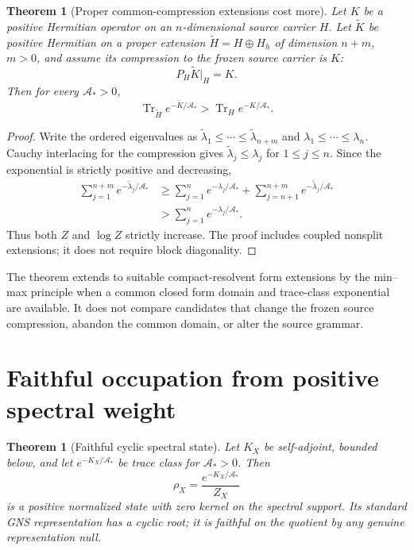\documentclass[11pt,a4paper]{article}
\newtheorem{theorem}[definition]{Theorem}
\theoremstyle{remark}
\newcommand{\Tr}{\operatorname{Tr}}
\begin{document}
\begin{theorem}[Proper common-compression extensions cost more]
\label{thm:strict_extension}
Let $K$ be a positive Hermitian operator on an $n$-dimensional source carrier
$H$.  Let $\widetilde K$ be positive Hermitian on a proper extension
$\widetilde H=H\oplus H_h$ of dimension $n+m$, $m>0$, and assume its
compression to the frozen source carrier is $K$:
\begin{equation}
 P_H\widetilde K\vert_H=K.
 \label{eq:compression}
\end{equation}
Then for every $\mathcal A_*>0$,
\begin{equation}
 \Tr_{\widetilde H}e^{-\widetilde K/\mathcal A_*}
 >\Tr_He^{-K/\mathcal A_*}.
 \label{eq:stricttrace}
\end{equation}
\end{theorem}

\begin{proof}
Write the ordered eigenvalues as
$\widetilde\lambda_1\le\cdots\le\widetilde\lambda_{n+m}$ and
$\lambda_1\le\cdots\le\lambda_n$.  Cauchy interlacing for the compression
gives $\widetilde\lambda_j\le\lambda_j$ for $1\le j\le n$.  Since the
exponential is strictly positive and decreasing,
\begin{align}
 \sum_{j=1}^{n+m}e^{-\widetilde\lambda_j/\mathcal A_*}
 &\ge \sum_{j=1}^{n}e^{-\lambda_j/\mathcal A_*}
   +\sum_{j=n+1}^{n+m}e^{-\widetilde\lambda_j/\mathcal A_*}\\
 &>\sum_{j=1}^{n}e^{-\lambda_j/\mathcal A_*}.
\end{align}
Thus both $Z$ and $\log Z$ strictly increase.  The proof includes coupled
nonsplit extensions; it does not require block diagonality.
\end{proof}

The theorem extends to suitable compact-resolvent form extensions by the
min--max principle when a common closed form domain and trace-class exponential
are available.  It does not compare candidates that change the frozen source
compression, abandon the common domain, or alter the source grammar.

\section{Faithful occupation from positive spectral weight}

\begin{theorem}[Faithful cyclic spectral state]
Let $K_X$ be self-adjoint, bounded below, and let
$e^{-K_X/\mathcal A_*}$ be trace class for $\mathcal A_*>0$.  Then
\begin{equation}
 \rho_X=\frac{e^{-K_X/\mathcal A_*}}{Z_X}
 \label{eq:rho}
\end{equation}
is a positive normalized state with zero kernel on the spectral support.  Its
standard GNS representation has a cyclic root; it is faithful on the quotient
by any genuine representation null.
\end{theorem}
\end{document}
